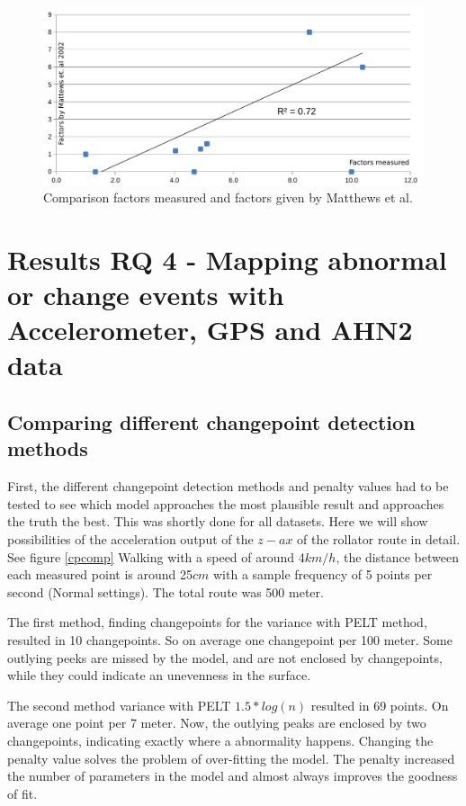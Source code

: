 \begin{figure}[hb]
\includegraphics[width=\textwidth]{img/R_factors_compared.pdf}
\centering
\caption{Comparison factors measured and factors given by Matthews et al.\label{comparefig}}
\end{figure} 

\clearpage



\section{Results RQ 4 - Mapping abnormal or change events with Accelerometer, GPS and AHN2 data}\label{Rrq2c}

\subsection{Comparing different changepoint detection methods}

First, the different changepoint detection methods and penalty values had to be tested to see which model approaches the most plausible result and approaches the truth the best. This was shortly done for all datasets. Here we will show possibilities of the acceleration output of the $z-ax$ of the rollator route in detail. See figure \ref{cpcomp} Walking with a speed of around 4$km/h$, the distance between each measured point is around 25$cm$ with a sample frequency of 5 points per second (Normal settings). The total route was 500 meter. 

The first method, finding changepoints for the variance with PELT method, resulted in 10 changepoints. So on average one changepoint per 100 meter. Some outlying peeks are missed by the model, and are not enclosed by changepoints, while they could indicate an unevenness in the surface. 

The second method variance with PELT $1.5*log(n)$ resulted in 69 points. On average one point per 7 meter. Now, the outlying peaks are enclosed by two changepoints, indicating exactly where a abnormality happens. Changing the penalty value solves the problem of over-fitting the model. The penalty increased the number of parameters in the model and almost always improves the goodness of fit. 


